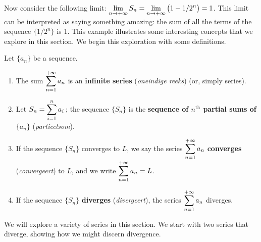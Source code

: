 Now consider the following limit: $\displaystyle \lim_{n\to+\infty}S_n = \lim_{n\to+\infty}\big(1-1/2^n\big) = 1$. This limit can be interpreted as saying something amazing: the sum of all the terms of the sequence $\{1/2^n\}$ is 1. This example illustrates some interesting concepts that we explore in this section. We begin this exploration with some definitions.

\begin{definition}\label{def:series}
Let $\{a_n\}$ be a sequence.
\begin{enumerate}
\item		The sum $\displaystyle \sum_{n=1}^{+\infty} a_n$ is an \textbf{infinite series} (\textit{oneindige reeks}) (or, simply series).
\item		Let $\displaystyle S_n = \sum_{i=1}^n a_i$\,; the sequence $\{S_n\}$ is the \textbf{sequence of $n^\text{th}$ partial sums of $\{a_n\}$} (\textit{partieelsom}).
\item		If the sequence $\{S_n\}$ converges to $L$, we say the series $\displaystyle \sum_{n=1}^{+\infty} a_n$ \textbf{converges} (\textit{convergeert}) to $L$, and we write $\displaystyle \sum_{n=1}^{+\infty} a_n = L$.
\item		If the sequence $\{S_n\}$ \textbf{diverges} (\textit{divergeert}), the series $\displaystyle \sum_{n=1}^{+\infty} a_n$ diverges.
\end{enumerate}
\end{definition}



We will explore a variety of series in this section. We start with two series that diverge, showing how we might discern divergence.

